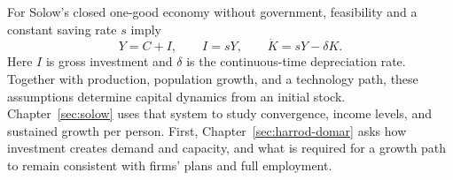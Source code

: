 For Solow's closed one-good economy without government, feasibility and a
constant saving rate $s$ imply
\begin{equation}
Y=C+I,\qquad I=sY,\qquad \dot K=sY-\delta K.
\end{equation}
Here $I$ is gross investment and $\delta$ is the continuous-time depreciation
rate. Together with production, population growth, and a technology path,
these assumptions determine capital dynamics from an initial stock.
Chapter~\ref{sec:solow} uses that system to study convergence, income levels,
and sustained growth per person. First, Chapter~\ref{sec:harrod-domar} asks how
investment creates demand and capacity, and what is required for a growth path
to remain consistent with firms' plans and full employment.
